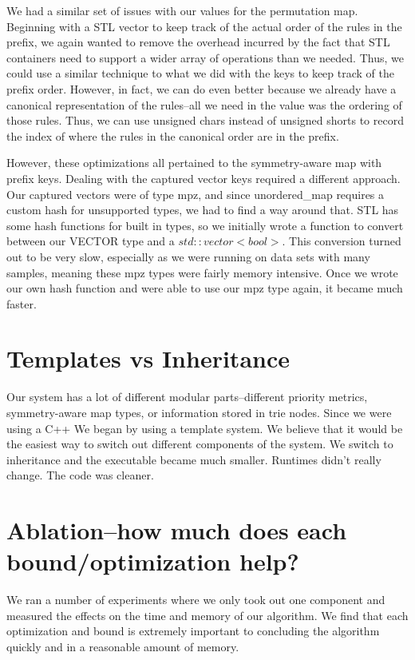 We had a similar set of issues with our values for the permutation map.
Beginning with a STL vector to keep track of the actual order of the rules in the prefix, we again wanted to remove the overhead incurred by the fact that STL containers need to support a wider array of operations than we needed.
Thus, we could use a similar technique to what we did with the keys to keep track of the prefix order.
However, in fact, we can do even better because we already have a canonical representation of the rules--all we need in the value was the ordering of those rules.
Thus, we can use unsigned chars instead of unsigned shorts to record the index of where the rules in the canonical order are in the prefix.

However, these optimizations all pertained to the symmetry-aware map with prefix keys.
Dealing with the captured vector keys required a different approach.
Our captured vectors were of type mpz, and since unordered_map requires a custom hash for unsupported types, we had to find a way around that.
STL has some hash functions for built in types, so we initially wrote a function to convert between our VECTOR type and a $std::vector<bool>$.
This conversion turned out to be very slow, especially as we were running on data sets with many samples, meaning these mpz types were fairly memory intensive.
Once we wrote our own hash function and were able to use our mpz type again, it became much faster.

\section{Templates vs Inheritance}
Our system has a lot of different modular parts--different priority metrics, symmetry-aware map types, or information stored in trie nodes.
Since we were using a C++ 
We began by using a template system.
We believe that it would be the easiest way to switch out different components of the system.
We switch to inheritance and the executable became much smaller.
Runtimes didn't really change.
The code was cleaner.

\section{Ablation--how much does each bound/optimization help?}

We ran a number of experiments where we only took out one component and measured the effects on the time and memory of our algorithm.
We find that each optimization and bound is extremely important to concluding the algorithm quickly and in a reasonable amount of memory.

